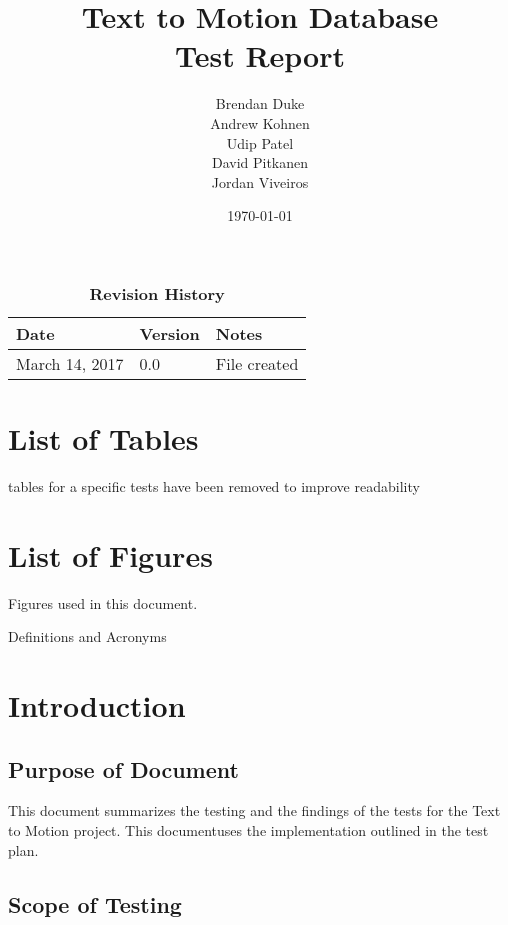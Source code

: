 \documentclass{scrreprt}
\begin{document}
\title{\bf Text to Motion Database\\[\baselineskip]\Large Test Report}
\author{Brendan Duke\\Andrew Kohnen\\Udip Patel\\David Pitkanen\\Jordan Viveiros}
\date{\today}

\maketitle
\tableofcontents


\begin{table}[bp]
\caption*{\bf Revision History}
\begin{tabularx}{\textwidth}{p{3.5cm}p{2cm}X}
\toprule {\bf Date} & {\bf Version} & {\bf Notes}\\
\midrule
March 14, 2017 & 0.0 & File created\\
\bottomrule
\end{tabularx}
\end{table}

\newpage



\chapter{List of Tables}
    tables for a specific tests have been removed to improve readability

\chapter{List of Figures}
    Figures used in this document.

    Definitions and Acronyms

\chapter{Introduction}

\section{Purpose of Document}
    This document summarizes the testing and the findings of the tests for the Text to Motion project. This documentuses the implementation outlined in the test plan.

\section{Scope of Testing}
\end{document}

